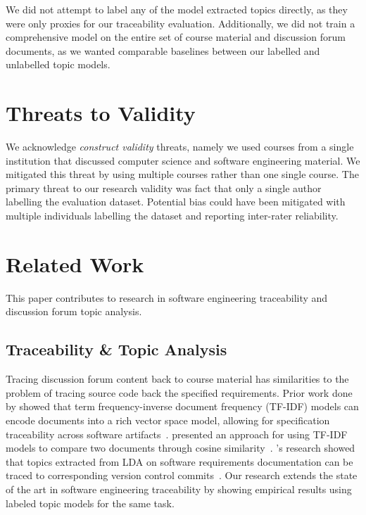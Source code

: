 \documentclass[sigconf, anonymous]{acmart}
\begin{document}
We did not attempt to label any of the model extracted topics directly, as they were only proxies for our traceability evaluation.
Additionally, we did not train a comprehensive model on the entire set of course material and discussion forum documents, as we wanted comparable baselines between our labelled and unlabelled topic models.

\section{Threats to Validity}
We acknowledge \textit{construct validity} threats, namely we used courses from a single institution that discussed computer science and software engineering material. We mitigated this threat by using multiple courses rather than one single course.
The primary threat to our research validity was fact that only a single author labelling the evaluation dataset.
Potential bias could have been mitigated with multiple individuals labelling the dataset and reporting inter-rater reliability.

\section{Related Work}
This paper contributes to research in software engineering traceability and discussion forum topic analysis.

\subsection{Traceability \& Topic Analysis}
Tracing discussion forum content back to course material has similarities to the problem of tracing source code back the specified requirements.
Prior work done by \citeauthor{4556122} showed that term frequency-inverse document frequency (TF-IDF) models can encode documents into a rich vector space model, allowing for specification traceability across software artifacts~\cite{4556122}.
\citeauthor{Tata:2007:EST:1328854.1328855} presented an approach for using TF-IDF models to compare two documents through cosine similarity~\cite{Tata:2007:EST:1328854.1328855}.
\citeauthor{hindle2012relating}'s research showed that topics extracted from LDA on software requirements documentation can be traced to corresponding version control commits~\cite{hindle2012relating}.
Our research extends the state of the art in software engineering traceability by showing empirical results using labeled topic models for the same task.
\end{document}
